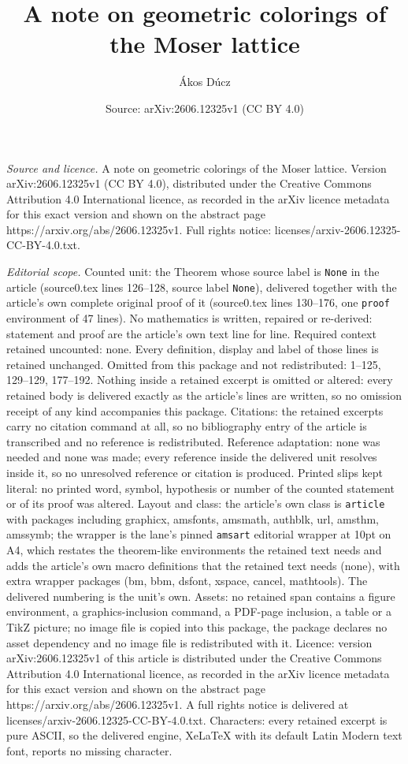 \documentclass[10pt,a4paper]{amsart}
\title[A note on geometric colorings of the Moser lattice]{A note on geometric colorings of the Moser lattice}
\author{\'Akos D\'ucz}
\date{Source: arXiv:2606.12325v1 (CC BY 4.0)}
\begin{document}
\maketitle

\noindent\emph{Source and licence.} A note on geometric colorings of the Moser lattice. Version arXiv:2606.12325v1 (CC BY 4.0), distributed under the Creative Commons Attribution 4.0 International licence, as recorded in the arXiv licence metadata for this exact version and shown on the abstract page https://arxiv.org/abs/2606.12325v1. Full rights notice: licenses/arxiv-2606.12325-CC-BY-4.0.txt.\par\smallskip

\noindent\textit{Editorial scope.} Counted unit: the Theorem whose source label is \texttt{None} in the article (source0.tex lines 126--128, source label \texttt{None}), delivered together with the article's own complete original proof of it (source0.tex lines 130--176, one \texttt{proof} environment of 47 lines). No mathematics is written, repaired or re-derived: statement and proof are the article's own text line for line. Required context retained uncounted: none. Every definition, display and label of those lines is retained unchanged. Omitted from this package and not redistributed: 1--125, 129--129, 177--192. Nothing inside a retained excerpt is omitted or altered: every retained body is delivered exactly as the article's lines are written, so no omission receipt of any kind accompanies this package. Citations: the retained excerpts carry no citation command at all, so no bibliography entry of the article is transcribed and no reference is redistributed. Reference adaptation: none was needed and none was made; every reference inside the delivered unit resolves inside it, so no unresolved reference or citation is produced. Printed slips kept literal: no printed word, symbol, hypothesis or number of the counted statement or of its proof was altered. Layout and class: the article's own class is \texttt{article} with packages including graphicx, amsfonts, amsmath, authblk, url, amsthm, amssymb; the wrapper is the lane's pinned \texttt{amsart} editorial wrapper at 10pt on A4, which restates the theorem-like environments the retained text needs and adds the article's own macro definitions that the retained text needs (none), with extra wrapper packages (bm, bbm, dsfont, xspace, cancel, mathtools). The delivered numbering is the unit's own. Assets: no retained span contains a figure environment, a graphics-inclusion command, a PDF-page inclusion, a table or a TikZ picture; no image file is copied into this package, the package declares no asset dependency and no image file is redistributed with it. Licence: version arXiv:2606.12325v1 of this article is distributed under the Creative Commons Attribution 4.0 International licence, as recorded in the arXiv licence metadata for this exact version and shown on the abstract page https://arxiv.org/abs/2606.12325v1. A full rights notice is delivered at licenses/arxiv-2606.12325-CC-BY-4.0.txt. Characters: every retained excerpt is pure ASCII, so the delivered engine, XeLaTeX with its default Latin Modern text font, reports no missing character.
\end{document}
